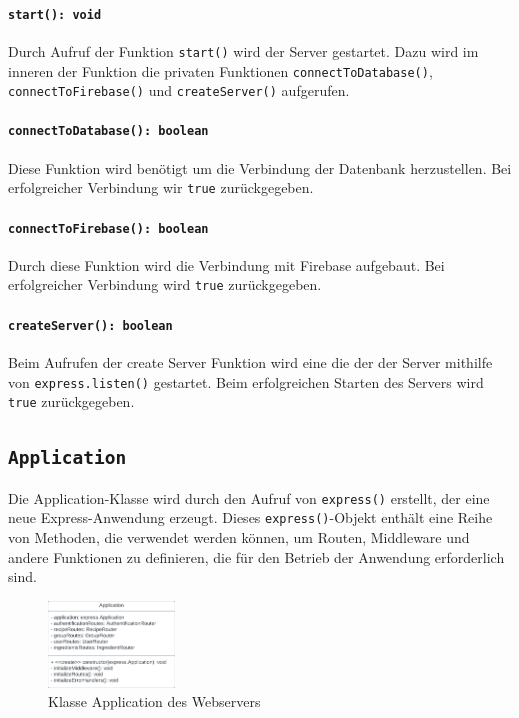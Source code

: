 \documentclass{entwurfsheft}
\begin{document}
\paragraph{\texttt{start(): void}}
Durch Aufruf der Funktion \texttt{start()} wird der Server gestartet. Dazu wird im inneren der Funktion die privaten Funktionen \texttt{connectToDatabase()}, \texttt{connectToFirebase()} und \texttt{createServer()} aufgerufen.
\paragraph{\texttt{connectToDatabase(): boolean}}
Diese Funktion wird benötigt um die Verbindung der Datenbank herzustellen. Bei erfolgreicher Verbindung wir \texttt{true} zurückgegeben.
\paragraph{\texttt{connectToFirebase(): boolean}}
Durch diese Funktion wird die Verbindung mit Firebase aufgebaut. Bei erfolgreicher Verbindung wird \texttt{true} zurückgegeben.
\paragraph{\texttt{createServer(): boolean}}
Beim Aufrufen der create Server Funktion wird eine die der der Server mithilfe von \texttt{express.listen()} gestartet. Beim erfolgreichen Starten des Servers wird \texttt{true} zurückgegeben.

\newpage

\subsection{\texttt{Application}}\label{sec:Application}
Die Application-Klasse wird durch den Aufruf von \texttt{express()} erstellt, der eine neue Express-Anwendung erzeugt. Dieses \texttt{express()}-Objekt enthält eine Reihe von Methoden, die verwendet werden können, um Routen, Middleware und andere Funktionen zu definieren, die für den Betrieb der Anwendung erforderlich sind.

\begin{figure}[htp]
    \centering
    \includegraphics[width = 0.3\textwidth]{images/webserver/application.pdf}
    \caption{Klasse Application des Webservers}
    \label{fig:application}
\end{figure}
\end{document}
